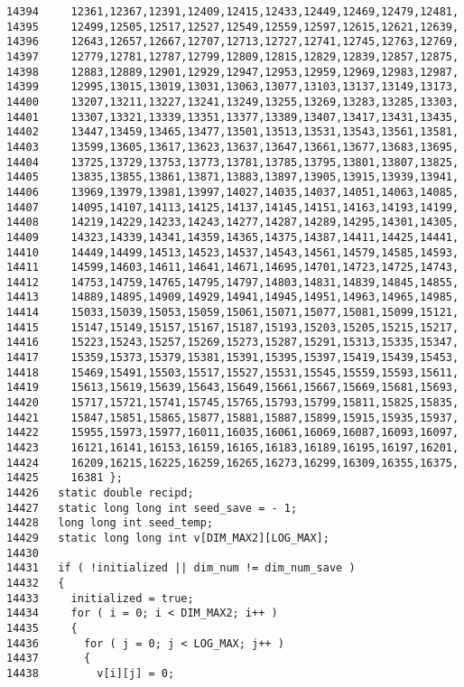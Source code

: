\begin{Code}
\begin{verbatim}
14394     12361,12367,12391,12409,12415,12433,12449,12469,12479,12481,
14395     12499,12505,12517,12527,12549,12559,12597,12615,12621,12639,
14396     12643,12657,12667,12707,12713,12727,12741,12745,12763,12769,
14397     12779,12781,12787,12799,12809,12815,12829,12839,12857,12875,
14398     12883,12889,12901,12929,12947,12953,12959,12969,12983,12987,
14399     12995,13015,13019,13031,13063,13077,13103,13137,13149,13173,
14400     13207,13211,13227,13241,13249,13255,13269,13283,13285,13303,
14401     13307,13321,13339,13351,13377,13389,13407,13417,13431,13435,
14402     13447,13459,13465,13477,13501,13513,13531,13543,13561,13581,
14403     13599,13605,13617,13623,13637,13647,13661,13677,13683,13695,
14404     13725,13729,13753,13773,13781,13785,13795,13801,13807,13825,
14405     13835,13855,13861,13871,13883,13897,13905,13915,13939,13941,
14406     13969,13979,13981,13997,14027,14035,14037,14051,14063,14085,
14407     14095,14107,14113,14125,14137,14145,14151,14163,14193,14199,
14408     14219,14229,14233,14243,14277,14287,14289,14295,14301,14305,
14409     14323,14339,14341,14359,14365,14375,14387,14411,14425,14441,
14410     14449,14499,14513,14523,14537,14543,14561,14579,14585,14593,
14411     14599,14603,14611,14641,14671,14695,14701,14723,14725,14743,
14412     14753,14759,14765,14795,14797,14803,14831,14839,14845,14855,
14413     14889,14895,14909,14929,14941,14945,14951,14963,14965,14985,
14414     15033,15039,15053,15059,15061,15071,15077,15081,15099,15121,
14415     15147,15149,15157,15167,15187,15193,15203,15205,15215,15217,
14416     15223,15243,15257,15269,15273,15287,15291,15313,15335,15347,
14417     15359,15373,15379,15381,15391,15395,15397,15419,15439,15453,
14418     15469,15491,15503,15517,15527,15531,15545,15559,15593,15611,
14419     15613,15619,15639,15643,15649,15661,15667,15669,15681,15693,
14420     15717,15721,15741,15745,15765,15793,15799,15811,15825,15835,
14421     15847,15851,15865,15877,15881,15887,15899,15915,15935,15937,
14422     15955,15973,15977,16011,16035,16061,16069,16087,16093,16097,
14423     16121,16141,16153,16159,16165,16183,16189,16195,16197,16201,
14424     16209,16215,16225,16259,16265,16273,16299,16309,16355,16375,
14425     16381 };
14426   static double recipd;
14427   static long long int seed_save = - 1;
14428   long long int seed_temp;
14429   static long long int v[DIM_MAX2][LOG_MAX];
14430 
14431   if ( !initialized || dim_num != dim_num_save )
14432   {
14433     initialized = true;
14434     for ( i = 0; i < DIM_MAX2; i++ )
14435     {
14436       for ( j = 0; j < LOG_MAX; j++ )
14437       {
14438         v[i][j] = 0;

\end{verbatim}
\end{Code}
